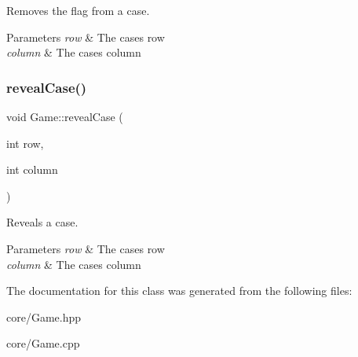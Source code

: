 Removes the flag from a case. 


\begin{DoxyParams}{Parameters}
{\em row} & The case\textquotesingle{}s row \\
\hline
{\em column} & The case\textquotesingle{}s column \\
\hline
\end{DoxyParams}
\mbox{\label{class_game_a55e7cb0517ed8bc8f0cbe6d3b2be6994}} 
\subsubsection{\texorpdfstring{reveal\+Case()}{revealCase()}}
{\footnotesize\ttfamily void Game\+::reveal\+Case (\begin{DoxyParamCaption}\item[{int}]{row,  }\item[{int}]{column }\end{DoxyParamCaption})}



Reveals a case. 


\begin{DoxyParams}{Parameters}
{\em row} & The case\textquotesingle{}s row \\
\hline
{\em column} & The case\textquotesingle{}s column \\
\hline
\end{DoxyParams}


The documentation for this class was generated from the following files\+:\begin{DoxyCompactItemize}
\item 
core/Game.\+hpp\item 
core/Game.\+cpp\end{DoxyCompactItemize}
